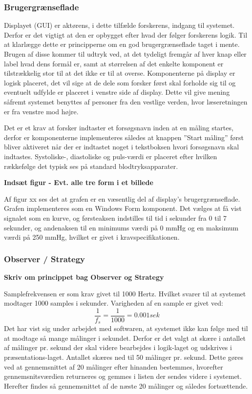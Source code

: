 \subsubsection{Brugergrænseflade}
Displayet (GUI) er aktørens, i dette tilfælde forskerens, indgang til systemet. Derfor er det vigtigt at den er opbygget efter hvad der følger forskerens logik. Til at klarlægge dette er principperne om en god brugergrænseflade taget i mente. Brugen af disse kommer til udtryk ved, at det tydeligt fremgår af hver knap eller label hvad dens formål er, samt at størrelsen af det enkelte komponent er tilstrækkelig stor til at det ikke er til at overse. Komponenterne på display er logisk placeret, det vil sige at de dele som forsker først skal forholde sig til og eventuelt udfylde er placeret i venstre side af display. Dette vil give mening såfremt systemet benyttes af personer fra den vestlige verden, hvor læseretningen er fra venstre mod højre. 

Det er et krav at forsker indtaster et forsøgsnavn inden at en måling startes, derfor er komponenterne implementeres således at knappen ”Start måling” først bliver aktiveret når der er indtastet noget i tekstboksen hvori forsøgsnavn skal indtastes. Systoliske-, diastoliske og puls-værdi er placeret efter hvilken rækkefølge det typisk ses på standard blodtryksapparater. 

\textbf{Indsæt figur - Evt. alle tre form i et billede}

Af figur xx ses det at grafen er en væsentlig del af display’s brugergrænseflade. Grafen implementeres som en Windows Form komponent. Det vælges at få vist signalet som en kurve, og førsteaksen indstilles til tid i sekunder fra 0 til 7 sekunder, og andenaksen til en minimums værdi på 0 mmHg og en maksimum værdi på 250 mmHg, hvilket er givet i kravspecifikationen. 

\subsubsection{Observer / Strategy}
\textbf{Skriv om princippet bag Observer og Strategy}

Samplefrekvensen er som krav givet til 1000 Hertz. Hvilket svarer til at systemet modtager 1000 samples i sekunder. Varigheden af en sample er givet ved: 
\begin{equation}
\frac{1}{f_s}=\frac{1}{1000}=0.001 sek
\end{equation}
Det har vist sig under arbejdet med softwaren, at systemet ikke kan følge med til at modtage så mange målinger i sekundet. Derfor er det valgt at skære i antallet af målinger pr. sekund der skal videre bearbejdes i logik-laget og udskrives i præsentations-laget. Antallet skæres ned til 50 målinger pr. sekund. Dette gøres ved at gennemsnittet af 20 målinger efter hinanden bestemmes, hvorefter gennemsnitsværdien returneres og gemmes i listen der sendes videre i systemet. Herefter findes så gennemsnittet af de næste 20 målinger og således fortsættende.   

